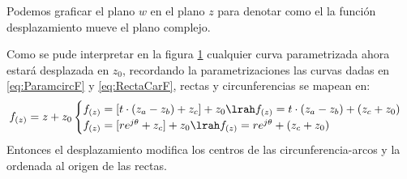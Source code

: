 Podemos graficar el plano $w$ en el plano $z$ para denotar como el la función desplazamiento mueve el plano complejo.
\begin{figure}[H]
    \centering
    
    \label{fig:DespZWF}
\end{figure}
Como se pude interpretar en la figura \ref{fig:DespZWF} cualquier curva parametrizada ahora estará desplazada en $z_0$, recordando la parametrizaciones las curvas dadas en \ref{eq:ParamcircF} y \ref{eq:RectaCarF}, rectas y circunferencias se mapean en:
\begin{equation}
    f_{(z)}=z+z_0
    \begin{cases}
        f_{(z)}=[t\cdot(z_a-z_b)+z_c]+z_0 \lrah f_{(z)}=t\cdot(z_a-z_b)+(z_c+z_0)\\
        f_{(z)}=[re^{j\theta}+z_c]+z_0 \lrah  f_{(z)}=re^{j\theta}+(z_c+z_0)
    \end{cases}
\end{equation}
Entonces el desplazamiento modifica los centros de las circunferencia-arcos y la ordenada al origen de las rectas.

